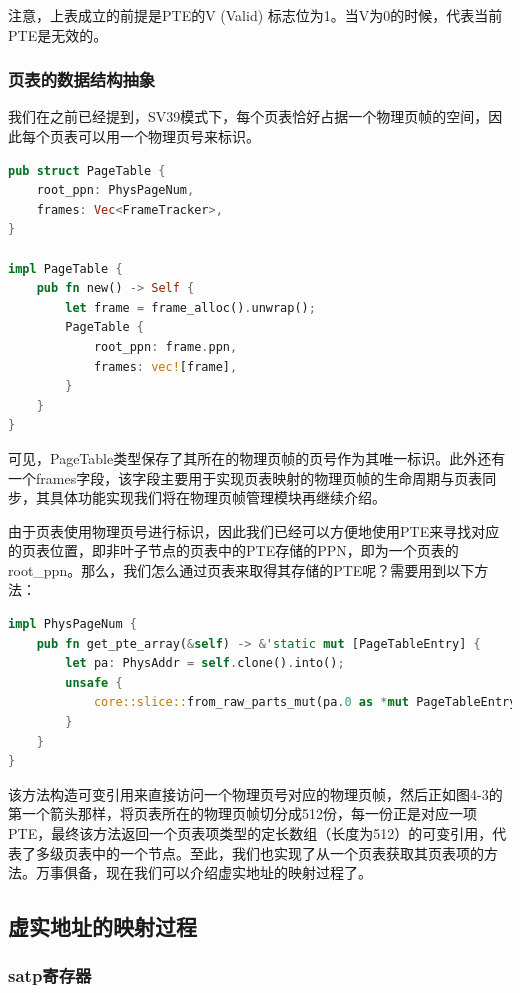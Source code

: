 注意，上表成立的前提是PTE的V (Valid) 标志位为1。当V为0的时候，代表当前PTE是无效的。

\subsubsection{页表的数据结构抽象}

我们在之前已经提到，SV39模式下，每个页表恰好占据一个物理页帧的空间，因此每个页表可以用一个物理页号来标识。

\begin{lstlisting}[language={Rust}, label={code:pagetable},
	caption={os/src/mm/page\_table.rs}]
pub struct PageTable {
	root_ppn: PhysPageNum,
	frames: Vec<FrameTracker>,
}

impl PageTable {
	pub fn new() -> Self {
		let frame = frame_alloc().unwrap();
		PageTable {
			root_ppn: frame.ppn,
			frames: vec![frame],
		}
	}
}
\end{lstlisting}

可见，PageTable类型保存了其所在的物理页帧的页号作为其唯一标识。此外还有一个frames字段，该字段主要用于实现页表映射的物理页帧的生命周期与页表同步，其具体功能实现我们将在物理页帧管理模块再继续介绍。

由于页表使用物理页号进行标识，因此我们已经可以方便地使用PTE来寻找对应的页表位置，即非叶子节点的页表中的PTE存储的PPN，即为一个页表的root\_ppn。那么，我们怎么通过页表来取得其存储的PTE呢？需要用到以下方法：

\begin{lstlisting}[language={Rust}, label={code:address},
	caption={os/src/mm/page\_table.rs}]
impl PhysPageNum {
	pub fn get_pte_array(&self) -> &'static mut [PageTableEntry] {
		let pa: PhysAddr = self.clone().into();
		unsafe {
			core::slice::from_raw_parts_mut(pa.0 as *mut PageTableEntry, 512)
		}
	}
}
\end{lstlisting}

该方法构造可变引用来直接访问一个物理页号对应的物理页帧，然后正如图4-3的第一个箭头那样，将页表所在的物理页帧切分成512份，每一份正是对应一项PTE，最终该方法返回一个页表项类型的定长数组（长度为512）的可变引用，代表了多级页表中的一个节点。至此，我们也实现了从一个页表获取其页表项的方法。万事俱备，现在我们可以介绍虚实地址的映射过程了。

\subsection{虚实地址的映射过程}

\subsubsection{satp寄存器} 


